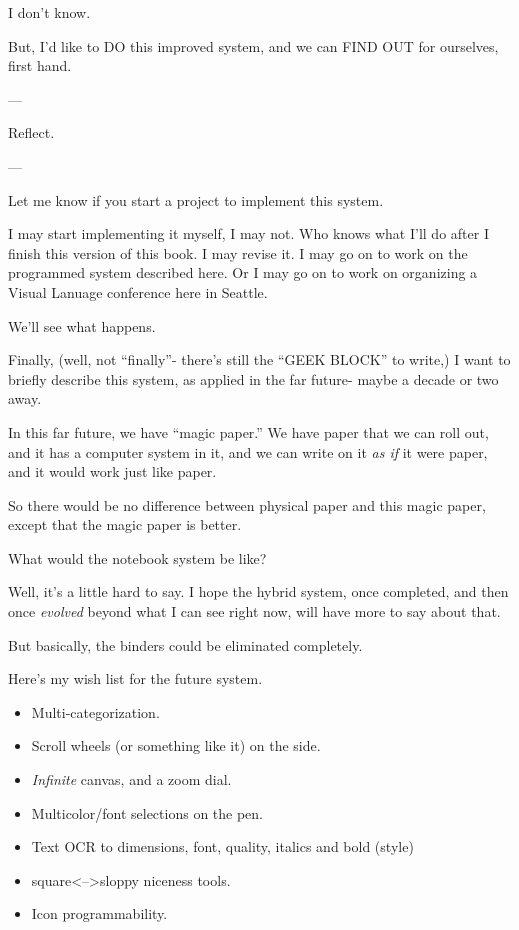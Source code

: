 \documentclass[oneside]{book}
\begin{document}
I don't know.

But, I'd like to DO this improved system, and we can FIND OUT for
ourselves, first hand.

---

Reflect.

---

Let me know if you start a project to implement this system.

I may start implementing it myself, I may not. Who knows what I'll do
after I finish this version of this book. I may revise it. I may go on
to work on the programmed system described here. Or I may go on to
work on organizing a Visual Lanuage conference here in Seattle.

We'll see what happens.

Finally, (well, not ``finally''- there's still the ``GEEK BLOCK'' to
write,) I want to briefly describe this system, as applied in the far
future- maybe a decade or two away.

In this far future, we have ``magic paper.'' We have paper that we can
roll out, and it has a computer system in it, and we can write on it
\emph{as if} it were paper, and it would work just like paper.

So there would be no difference between physical paper and this magic
paper, except that the magic paper is better.

What would the notebook system be like?

Well, it's a little hard to say. I hope the hybrid system, once
completed, and then once \emph{evolved} beyond what I can see right now,
will have more to say about that.

But basically, the binders could be eliminated completely.

Here's my wish list for the future system.

\begin{itemize}
\item Multi-categorization.
\item Scroll wheels (or something like it) on the side.
\item \emph{Infinite} canvas, and a zoom dial.
\item Multicolor/font selections on the pen.
\item Text OCR to dimensions, font, quality, italics and bold (style)
\item square<-->sloppy niceness tools.
\item Icon programmability.
\end{itemize}
\end{document}
